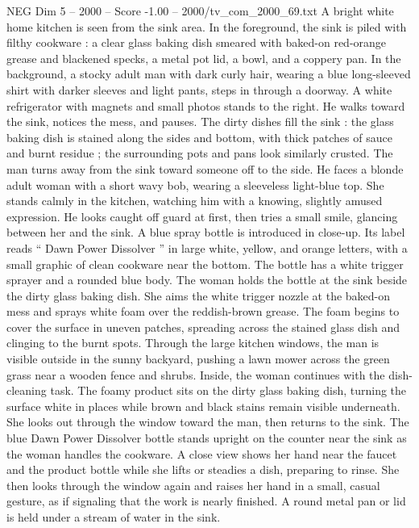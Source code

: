 \begin{textsample}{NEG Dim 5 – 2000 – Score -1.00 – 2000/tv\_com\_2000\_69.txt}  \label{ex:f5_neg_076}
A bright white home kitchen is seen from the sink area.
In the foreground, the sink is piled with filthy cookware : a clear glass baking dish smeared with baked-on red-orange grease and blackened specks, a metal pot lid, a bowl, and a coppery pan.
In the background, a stocky adult man with dark curly hair, wearing a blue long-sleeved shirt with darker sleeves and light pants, steps in through a doorway.
A white refrigerator with magnets and small photos stands to the right.
He walks toward the sink, notices the mess, and pauses.
The dirty dishes fill the sink : the glass baking dish is stained along the sides and bottom, with thick patches of sauce and burnt residue ; the surrounding pots and pans look similarly crusted.
The man turns away from the sink toward someone off to the side.
He faces a blonde adult woman with a short wavy bob, wearing a sleeveless light-blue top.
She stands calmly in the kitchen, watching him with a knowing, slightly amused expression.
He looks caught off guard at first, then tries a small smile, glancing between her and the sink.
A blue spray bottle is introduced in close-up.
Its label reads “ Dawn Power Dissolver ” in large white, yellow, and orange letters, with a small graphic of clean cookware near the bottom.
The bottle has a white trigger sprayer and a rounded blue body.
The woman holds the bottle at the sink beside the dirty glass baking dish.
She aims the white trigger nozzle at the baked-on mess and sprays white foam over the reddish-brown grease.
The foam begins to cover the surface in uneven patches, spreading across the stained glass dish and clinging to the burnt spots.
Through the large kitchen windows, the man is visible outside in the sunny backyard, pushing a lawn mower across the green grass near a wooden fence and shrubs.
Inside, the woman continues with the dish-cleaning task.
The foamy product sits on the dirty glass baking dish, turning the surface white in places while brown and black stains remain visible underneath.
She looks out through the window toward the man, then returns to the sink.
The blue Dawn Power Dissolver bottle stands upright on the counter near the sink as the woman handles the cookware.
A close view shows her hand near the faucet and the product bottle while she lifts or steadies a dish, preparing to rinse.
She then looks through the window again and raises her hand in a small, casual gesture, as if signaling that the work is nearly finished.
A round metal pan or lid is held under a stream of water in the sink.

\end{textsample}
